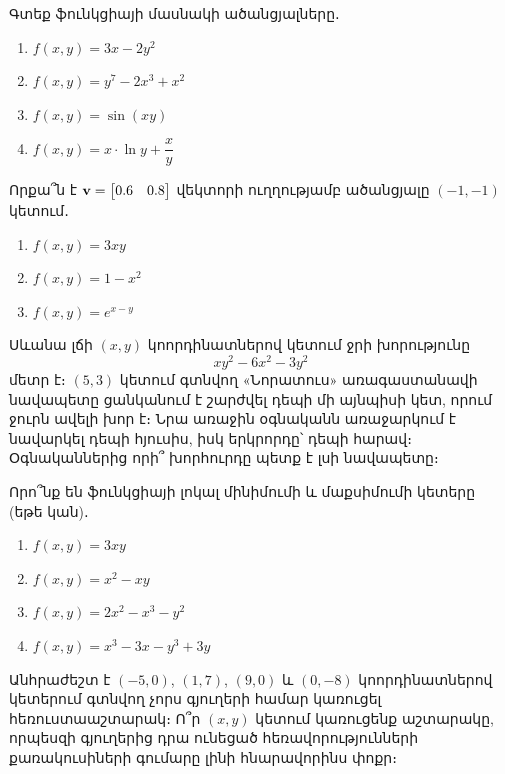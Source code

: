\begin{problem}
Գտեք ֆունկցիայի մասնակի ածանցյալները․
\begin{enumerate}[label={\alph*}․]
\item $f(x,y)=3x-2y^2$
\item $f(x,y)=y^7-2x^3+x^2$
\item $f(x,y)=\sin{(xy)}$
\item $f(x,y)=x \cdot \ln y+\dfrac{x}{y}$
\end{enumerate}
\end{problem}


\begin{problem}
Որքա՞ն է $\mathbf{v}=\begin{bmatrix}
    0.6 & 0.8
\end{bmatrix}$ վեկտորի ուղղությամբ ածանցյալը $(-1,-1)$ կետում․
\begin{enumerate}[label={\alph*}․]
\item $f(x,y) = 3xy$
\item $f(x,y) = 1-x^2$
\item $f(x,y) = e^{x-y}$
\end{enumerate}
\end{problem}


\begin{problem}
Սևանա լճի $(x, y)$ կոորդինատներով կետում ջրի խորությունը 
\[xy^{2}-6x^{2}-3y^{2}\]
մետր է։ $(5, 3)$ կետում գտնվող «Նորատուս» առագաստանավի նավա\-պետը ցանկանում է շարժվել դեպի մի այնպիսի կետ, որում ջուրն ավելի խոր է։ Նրա առաջին օգնականն առաջարկում է նավարկել դեպի հյուսիս, իսկ երկրորդը՝ դեպի հարավ։ Օգնականներից որի՞ խորհուրդը պետք է լսի նավապետը։
\end{problem}


\begin{problem}
Որո՞նք են ֆունկցիայի լոկալ մինիմումի և մաքսիմումի կետերը (եթե կան)․
\begin{enumerate}[label={\alph*}․]
\item $f(x, y) = 3xy$
\item $f(x, y) = x^2-xy$
\item $f(x, y) = 2x^2 - x^3 - y^2$
\item $f(x, y) = x^3 - 3x - y^3 + 3y$
\end{enumerate}
\end{problem}


\begin{problem}
Անհրաժեշտ է $(-5, 0)$, $(1, 7)$, $(9, 0)$ և $(0, -8)$ կոորդինատնե\-րով կետերում գտնվող չորս գյուղերի համար կառուցել հեռուստաաշտարակ։ Ո՞ր $(x, y)$ կետում կառուցենք աշտարակը, որպեսզի գյուղերից դրա ունեցած հեռավորությունների քառակուսիների գումարը լինի հնարա\-վորինս փոքր։
\end{problem}

